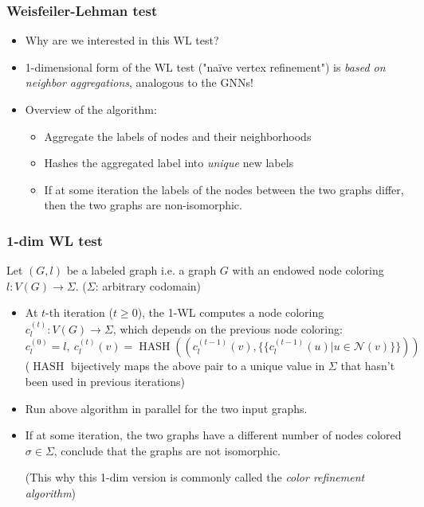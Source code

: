 \documentclass{beamer}
\DeclareMathOperator{\hash}{HASH}
\begin{document}
\begin{frame}
\frametitle{Weisfeiler-Lehman test}

\begin{itemize}
	\item Why are we interested in this WL test? \pause
	
	\item 1-dimensional form of the WL test ("na\"ive vertex refinement") is {\it based on neighbor aggregations}, analogous to the GNNs! \pause
	
	\item Overview of the algorithm:
	\begin{itemize}
		\item Aggregate the labels of nodes and their neighborhoods
		\item Hashes the aggregated label into {\it unique} new labels
		\item If at some iteration the labels of the nodes between the two graphs differ, then the two graphs are non-isomorphic.
	\end{itemize}
	
\end{itemize}

\end{frame}

\begin{frame}
\frametitle{1-dim WL test}

Let $(G, l)$ be a labeled graph i.e. a graph $G$ with an endowed node coloring $l : V(G) \rightarrow \Sigma$.
($\Sigma$: arbitrary codomain) \pause

\begin{itemize}
	\item At $t$-th iteration ($t \geq 0$), the 1-WL computes a node coloring $c_l^{(t)} : V(G) \rightarrow \Sigma$, which depends on the previous node coloring:
	$$c_l^{(0)} = l, \ c_l^{(t)}(v) = \hash \left( \left( c_l^{(t - 1)}(v), \{\{ c_l^{(t - 1)}(u) | u \in \mathscr{N}(v) \}\} \right) \right)$$	
($\hash$ bijectively maps the above pair to a unique value in $\Sigma$ that hasn't been used in previous iterations)	
	\pause
	
	\item Run above algorithm in parallel for the two input graphs. \pause
	
	\item If at some iteration, the two graphs have a different number of nodes colored $\sigma \in \Sigma$, conclude that the graphs are not isomorphic. \pause
	
	(This why this 1-dim version is commonly called the {\it color refinement algorithm})
\end{itemize}

\end{frame}
\end{document}
